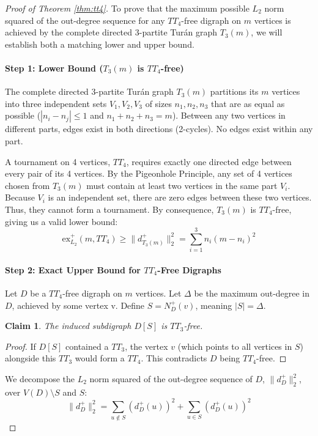 \documentclass[a4paper]{amsart}
\newtheorem{claim}[theorem]{Claim}
\begin{document}
\begin{proof}[Proof of Theorem \ref{thm:tt4}]
To prove that the maximum possible $L_2$ norm squared of the out-degree sequence for any $TT_4$-free digraph on $m$ vertices is achieved by the complete directed 3-partite Tur\'an graph $T_3(m)$,
we will establish both a matching lower and upper bound.

\paragraph{Step 1: Lower Bound ($T_3(m)$ is $TT_4$-free)}
The complete directed 3-partite Tur\'an graph $T_3(m)$ partitions its $m$ vertices into three independent sets $V_1, V_2, V_3$ of sizes $n_1, n_2, n_3$ that are as equal as possible ($|n_i - n_j| \le 1$ and $n_1+n_2+n_3=m$).
Between any two vertices in different parts, edges exist in both directions (2-cycles).
No edges exist within any part.

A tournament on 4 vertices, $TT_4$, requires exactly one directed edge between every pair of its 4 vertices.
By the Pigeonhole Principle, any set of 4 vertices chosen from $T_3(m)$ must contain at least two vertices in the same part $V_i$.
Because $V_i$ is an independent set, there are zero edges between these two vertices.
Thus, they cannot form a tournament.
By consequence, $T_3(m)$ is $TT_4$-free, giving us a valid lower bound:
\[
\text{ex}^+_{L_2}(m, TT_4) \ge \|d^+_{T_3(m)}\|_2^2 = \sum_{i=1}^3 n_i(m-n_i)^2
\]

\paragraph{Step 2: Exact Upper Bound for $TT_4$-Free Digraphs}
Let $D$ be a $TT_4$-free digraph on $m$ vertices.
Let $\Delta$ be the maximum out-degree in $D$, achieved by some vertex v.
Define $S = N^+_D(v)$, meaning $|S| = \Delta$.

\begin{claim}
The induced subdigraph $D[S]$ is $TT_3$-free.
\end{claim}

\begin{proof}
If $D[S]$ contained a $TT_3$, the vertex $v$ (which points to all vertices in $S$) alongside this $TT_3$ would form a $TT_4$.
This contradicts $D$ being $TT_4$-free.
\end{proof}

We decompose the $L_2$ norm squared of the out-degree sequence of $D$, $\|d^+_D\|_2^2$, over $V(D) \setminus S$ and $S$:
\[
\|d^+_D\|_2^2 = \sum_{u \notin S} (d^+_D(u))^2 + \sum_{u \in S} (d^+_D(u))^2
\]


\end{proof}
\end{document}
